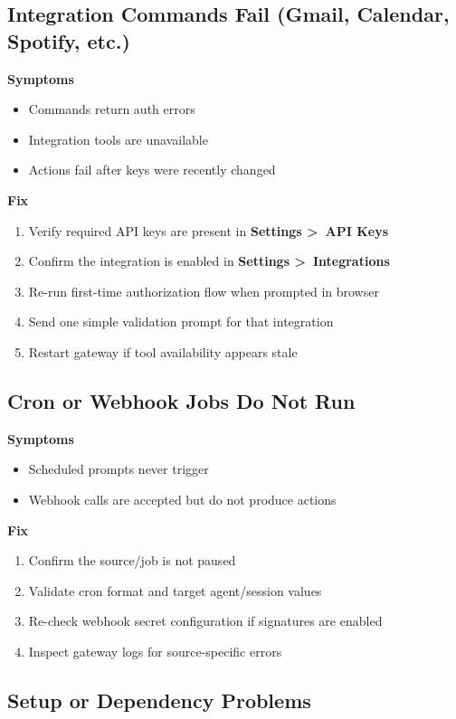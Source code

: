 \documentclass{article}
\begin{document}
\subsection{Integration Commands Fail (Gmail, Calendar, Spotify, etc.)}

\textbf{Symptoms}
\begin{itemize}
\item Commands return auth errors
\item Integration tools are unavailable
\item Actions fail after keys were recently changed
\end{itemize}

\textbf{Fix}
\begin{enumerate}
\item Verify required API keys are present in \textbf{Settings \textgreater\ API Keys}
\item Confirm the integration is enabled in \textbf{Settings \textgreater\ Integrations}
\item Re-run first-time authorization flow when prompted in browser
\item Send one simple validation prompt for that integration
\item Restart gateway if tool availability appears stale
\end{enumerate}

\subsection{Cron or Webhook Jobs Do Not Run}

\textbf{Symptoms}
\begin{itemize}
\item Scheduled prompts never trigger
\item Webhook calls are accepted but do not produce actions
\end{itemize}

\textbf{Fix}
\begin{enumerate}
\item Confirm the source/job is not paused
\item Validate cron format and target agent/session values
\item Re-check webhook secret configuration if signatures are enabled
\item Inspect gateway logs for source-specific errors
\end{enumerate}

\subsection{Setup or Dependency Problems}
\end{document}
